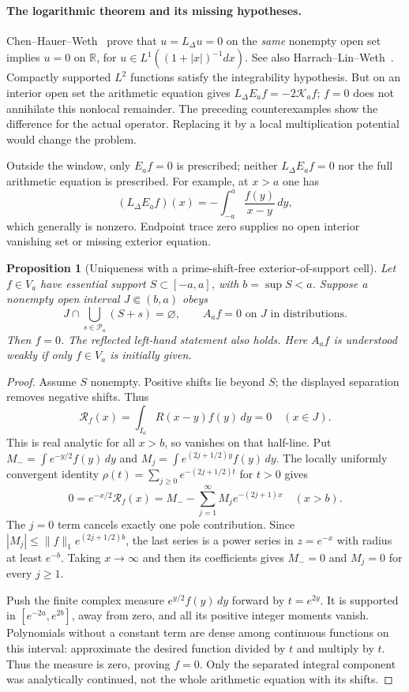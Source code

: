 \documentclass[11pt]{article}
\newtheorem{proposition}[theorem]{Proposition}
\theoremstyle{remark}
\begin{document}
\paragraph{The logarithmic theorem and its missing hypotheses.}
Chen--Hauer--Weth~\cite[Theorem 1.7]{ChenHauerWeth2023} prove that
$u=L_\Delta u=0$ on the \emph{same} nonempty open set implies $u=0$
on $\mathbb R$, for $u\in L^1((1+|x|)^{-1}dx)$.
See also Harrach--Lin--Weth~\cite[Proposition 4.1]{HarrachLinWeth2025}.
Compactly supported $L^2$ functions satisfy the integrability hypothesis.
But on an interior open set the arithmetic equation gives
$L_\Delta E_af=-2\mathcal K_a f$; $f=0$ does not annihilate this
nonlocal remainder. The preceding counterexamples show the difference
for the actual operator. Replacing it by a local multiplication
potential would change the problem.

Outside the window, only $E_af=0$ is prescribed; neither
$L_\Delta E_af=0$ nor the full arithmetic equation is prescribed.
For example, at $x>a$ one has
\[
 (L_\Delta E_af)(x)=-\int_{-a}^a\frac{f(y)}{x-y}\,dy,
\]
which generally is nonzero. Endpoint trace zero supplies no open
interior vanishing set or missing exterior equation.

\begin{proposition}[Uniqueness with a prime-shift-free exterior-of-support cell]
\label{prop:ns55-prime-free-cell}
Let $f\in V_a$ have essential support $S\subset[-a,a]$, with
$b=\sup S<a$. Suppose a nonempty open interval $J\Subset(b,a)$ obeys
\[
 J\cap\bigcup_{s\in\mathcal P_a}(S+s)=\varnothing,\qquad
 A_af=0\text{ on }J\text{ in distributions}.
\]
Then $f=0$. The reflected left-hand statement also holds.
Here $A_af$ is understood weakly if only $f\in V_a$ is initially given.
\end{proposition}
\begin{proof}
Assume $S$ nonempty. Positive shifts lie beyond $S$; the displayed
separation removes negative shifts. Thus
\[
 \mathcal R_f(x)=\int_{I_a}R(x-y)f(y)\,dy=0\quad(x\in J).
\]
This is real analytic for all $x>b$, so vanishes on that half-line.
Put
$M_-=\int e^{-y/2}f(y)\,dy$ and
$M_j=\int e^{(2j+1/2)y}f(y)\,dy$.
The locally uniformly convergent identity
$\rho(t)=\sum_{j\ge0}e^{-(2j+1/2)t}$ for $t>0$ gives
\[
 0=e^{-x/2}\mathcal R_f(x)
   =M_- -\sum_{j=1}^\infty M_j e^{-(2j+1)x}\quad(x>b).
\]
The $j=0$ term cancels exactly one pole contribution. Since
$|M_j|\le\|f\|_1e^{(2j+1/2)b}$, the last series is a power
series in $z=e^{-x}$ with radius at least $e^{-b}$.
Taking $x\to\infty$ and then its coefficients gives $M_-=0$
and $M_j=0$ for every $j\ge1$.

Push the finite complex measure $e^{y/2}f(y)\,dy$ forward by
$t=e^{2y}$. It is supported in $[e^{-2a},e^{2b}]$, away from zero,
and all its positive integer moments vanish. Polynomials without a
constant term are dense among continuous functions on this interval:
approximate the desired function divided by $t$ and multiply by $t$.
Thus the measure is zero, proving $f=0$.
Only the separated integral component was analytically continued,
not the whole arithmetic equation with its shifts.
\end{proof}
\end{document}
